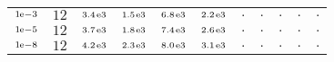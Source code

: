 \begin{tiny}
\begin{tabular}{@{$\;$}c@{$\;$}|@{$\;$}c@{$\;$}@{$\;$}c@{$\;$}@{$\;$}c@{$\;$}@{$\;$}c@{$\;$}@{$\;$}c@{$\;$}|@{$\;$}c@{$\;$}@{$\;$}c@{$\;$}@{$\;$}c@{$\;$}@{$\;$}c@{$\;$}@{$\;$}c@{$\;$}}
$\scriptstyle1\!\mathrm{\hspace{0.10em}e}-3$ & $\scriptstyle12$ & $\scriptstyle3.4\mathrm{\hspace{0.10em}e}3$ & $\scriptstyle1.5\mathrm{\hspace{0.10em}e}3$ & $\scriptstyle6.8\mathrm{\hspace{0.10em}e}3$ & $\scriptstyle2.2\mathrm{\hspace{0.10em}e}3$ & $\scriptstyle.$ & $\scriptstyle.$ & $\scriptstyle.$ & $\scriptstyle.$ & $\scriptstyle.$\\ 
$\scriptstyle1\!\mathrm{\hspace{0.10em}e}-5$ & $\scriptstyle12$ & $\scriptstyle3.7\mathrm{\hspace{0.10em}e}3$ & $\scriptstyle1.8\mathrm{\hspace{0.10em}e}3$ & $\scriptstyle7.4\mathrm{\hspace{0.10em}e}3$ & $\scriptstyle2.6\mathrm{\hspace{0.10em}e}3$ & $\scriptstyle.$ & $\scriptstyle.$ & $\scriptstyle.$ & $\scriptstyle.$ & $\scriptstyle.$\\ 
$\scriptstyle1\!\mathrm{\hspace{0.10em}e}-8$ & $\scriptstyle12$ & $\scriptstyle4.2\mathrm{\hspace{0.10em}e}3$ & $\scriptstyle2.3\mathrm{\hspace{0.10em}e}3$ & $\scriptstyle8.0\mathrm{\hspace{0.10em}e}3$ & $\scriptstyle3.1\mathrm{\hspace{0.10em}e}3$ & $\scriptstyle.$ & $\scriptstyle.$ & $\scriptstyle.$ & $\scriptstyle.$ & $\scriptstyle.$\\ 
\end{tabular} 
\end{tiny} 
